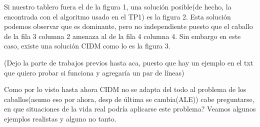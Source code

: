 \documentclass[a4paper]{article}
\begin{document}
Si nuestro tablero fuera el de la figura 1, una solución posible(de hecho, la encontrada con el algoritmo usado en el TP1) es la figura 2. Esta solución podemos observar que es dominante, pero no independiente puesto que el caballo de la fila 3 columna 2 amenaza al de la fila 4 columna 4. Sin embargo en este caso, existe una solución CIDM como lo es la figura 3. 

(Dejo la parte de trabajos previos hasta aca, puesto que hay un ejemplo en el txt que quiero probar si funciona y agregaría un par de líneas)

Como por lo visto hasta ahora CIDM no se adapta del todo al problema de los caballos(asumo eso por ahora, desp de última se cambia(ALE)) cabe preguntarse, en que situaciones de la vida real podría aplicarse este problema? Veamos algunos ejemplos realistas y alguno no tanto.
\end{document}
